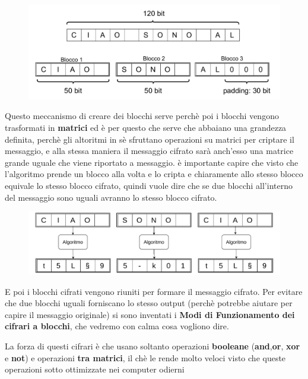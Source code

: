 \documentclass{report}
\begin{document}
\begin{figure}[h]
    \centering
    \includegraphics[width=\linewidth]{logos/cripto6.pdf}
\end{figure}



Questo meccanismo di creare dei blocchi serve perchè poi i blocchi vengono trasformati in \textbf{matrici} ed è per questo che serve che abbaiano una grandezza definita, perchè gli altoritmi in sè sfruttano operazioni su matrici per criptare il messaggio, e alla stessa maniera il messaggio cifrato sarà anch'esso una matrice grande uguale che viene riportato a messaggio. è importante capire che visto che l'algoritmo prende un blocco alla volta e lo cripta e chiaramente allo stesso blocco equivale lo stesso blocco cifrato, quindi vuole dire che se due blocchi all'interno del messaggio sono uguali avranno lo stesso blocco cifrato. 


\begin{figure}[h]
    \centering
    \includegraphics[width=\linewidth]{logos/cripto7.pdf}
\end{figure}

E poi i blocchi cifrati vengono riuniti per formare il messaggio cifrato. Per evitare che due blocchi uguali forniscano lo stesso output (perchè potrebbe aiutare per capire il messaggio originale) si sono inventati i \textbf{Modi di Funzionamento dei cifrari a blocchi}, che vedremo con calma cosa vogliono dire.

La forza di questi cifrari è che usano soltanto operazioni \textbf{booleane} (\textbf{and},\textbf{or}, \textbf{xor} e \textbf{not}) e operazioni \textbf{tra matrici}, il chè le rende molto veloci visto che queste operazioni  sotto ottimizzate nei computer odierni
\end{document}
